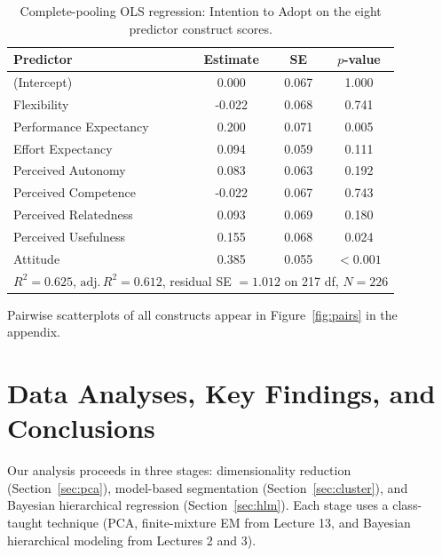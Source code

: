 \documentclass[11pt]{article}
\begin{document}
\begin{table}[H]
  \centering
  \caption{Complete-pooling OLS regression: Intention to Adopt on the
           eight predictor construct scores.}
  \label{tab:ols-baseline}
  \begin{tabular}{lccc}
    \toprule
    Predictor                  & Estimate & SE    & $p$-value \\
    \midrule
    (Intercept)                &  0.000   & 0.067 & 1.000 \\
    Flexibility                & -0.022   & 0.068 & 0.741 \\
    Performance Expectancy     &  0.200   & 0.071 & 0.005 \\
    Effort Expectancy          &  0.094   & 0.059 & 0.111 \\
    Perceived Autonomy         &  0.083   & 0.063 & 0.192 \\
    Perceived Competence       & -0.022   & 0.067 & 0.743 \\
    Perceived Relatedness      &  0.093   & 0.069 & 0.180 \\
    Perceived Usefulness       &  0.155   & 0.068 & 0.024 \\
    Attitude                   &  0.385   & 0.055 & $<0.001$ \\
    \midrule
    \multicolumn{4}{l}{$R^2 = 0.625$, $\text{adj.}\,R^2 = 0.612$,
                       residual SE $= 1.012$ on 217 df, $N = 226$} \\
    \bottomrule
  \end{tabular}
\end{table}

Pairwise scatterplots of all constructs appear in Figure~\ref{fig:pairs}
in the appendix.

\section{Data Analyses, Key Findings, and Conclusions}
\label{sec:analyses}

Our analysis proceeds in three stages: dimensionality reduction
(Section~\ref{sec:pca}), model-based segmentation
(Section~\ref{sec:cluster}), and Bayesian hierarchical regression
(Section~\ref{sec:hlm}). Each stage uses a class-taught technique
(PCA, finite-mixture EM from Lecture 13, and Bayesian hierarchical
modeling from Lectures 2 and 3).
\end{document}
